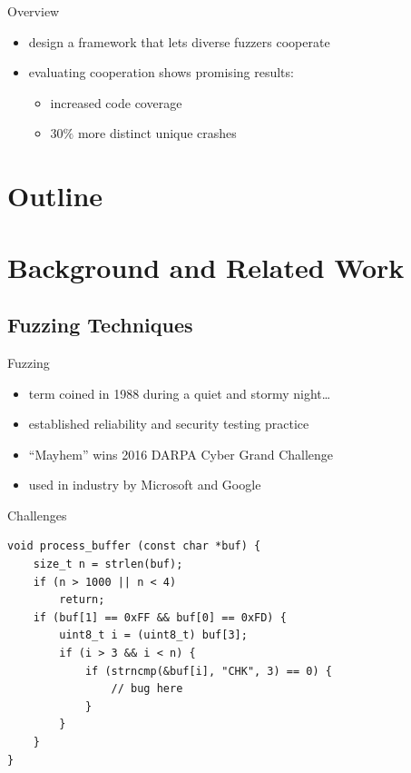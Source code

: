 \documentclass[\HandoutMode,table]{beamer}
\title{\myTitle}
\subtitle{\mySubtitle}
\author{\myName}
\institute[VU]{\myUni}
\begin{document}
\frame{\titlepage}

\begin{frame}{Overview}
    \begin{itemize}
        \item{} design a framework that lets diverse fuzzers cooperate
        \item{} evaluating cooperation shows promising results:
            \begin{itemize}
                \item{} increased code coverage
                \item{} $30\%$ more distinct unique crashes
            \end{itemize}
    \end{itemize}
\end{frame}

\section*{Outline}

\begin{frame}
    \tableofcontents[pausesections]
\end{frame}

\section{Background and Related Work}

\subsection{Fuzzing Techniques}

\begin{frame}{Fuzzing}
    \begin{itemize}
        \item<1-> term coined in 1988 during a quiet and stormy night\ldots\
        \item<2-> established reliability and security testing practice
        \item<2-> ``Mayhem'' wins 2016 DARPA Cyber Grand Challenge
        \item<2-> used in industry by Microsoft and Google
    \end{itemize}
\end{frame}

\begin{frame}[fragile]{Challenges}
\begin{lstlisting}[language={[modern]C},style=numbered]
void process_buffer (const char *buf) {
    size_t n = strlen(buf);
    if (n > 1000 || n < 4)
        return;
    if (buf[1] == 0xFF && buf[0] == 0xFD) {
        uint8_t i = (uint8_t) buf[3];
        if (i > 3 && i < n) {
            if (strncmp(&buf[i], "CHK", 3) == 0) {
                // bug here
            }
        }
    }
}
\end{lstlisting}
\end{frame}
\end{document}
